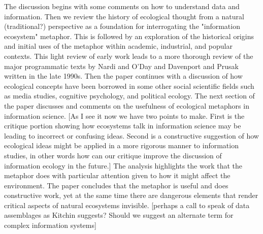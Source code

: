 The discussion begins with some comments on how to understand data and information. Then we review the history of ecological thought from a natural (traditional?) perspective as a foundation for interrogating the "information ecosystem" metaphor. This is followed by an exploration of the historical origins and initial uses of the metaphor within academic, industrial, and popular contexts. This light review of early work leads to a more thorough review of the major programmatic texts by Nardi and O'Day and Davenport and Prusak written in the late 1990s. Then the paper continues with a discussion of how ecological concepts have been borrowed in some other social scientific fields such as media studies, cognitive psychology, and political ecology. The next section of the paper discusses and comments on the usefulness of ecological metaphors in information science. [As I see it now we have two points to make. First is the critique portion showing how ecosystems talk in information science may be leading to incorrect or confusing ideas. Second is a constructive suggestion of how ecological ideas might be applied in a more rigorous manner to information studies, in other words how can our critique improve the discussion of information ecology in the future.] The analysis highlights the work that the metaphor does with particular attention given to how it might affect the environment. The paper concludes that the metaphor is useful and does constructive work, yet at the same time there are dangerous elements that render critical aspects of natural ecosystems invisible. [perhaps a call to speak of data assemblages as Kitchin suggests? Should we suggest an alternate term for complex information systems]
